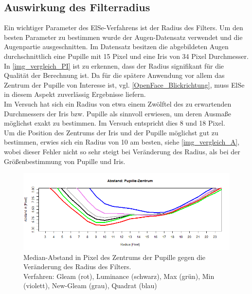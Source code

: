 \subsection{Auswirkung des Filterradius}
Ein wichtiger Parameter des ElSe-Verfahrens ist der Radius des Filters. Um den besten Parameter zu bestimmen wurde der Augen-Datensatz \cite{database_Eye} verwendet und die Augenpartie ausgeschnitten. Im Datensatz besitzen die abgebildeten Augen durchschnittlich eine Pupille mit 15 Pixel und eine Iris von 34 Pixel Durchmesser.\\
In \autoref{img_vergleich_PI} ist zu erkennen, dass der Radius signifikant für die Qualität der Berechnung ist. Da für die spätere Anwendung vor allem das Zentrum der Pupille von Interesse ist, vgl. \autoref{OpenFace_Blickrichtung}, muss ElSe in diesem Aspekt zuverlässig Ergebnisse liefern.\\
Im Versuch hat sich ein Radius von etwa einem Zwölftel des zu erwartenden Durchmessers der Iris bzw. Pupille als sinnvoll erwiesen, um deren Ausmaße möglichst exakt zu bestimmen. Im Versuch entspricht dies 8 und 18 Pixel.\\
Um die Position des Zentrums der Iris und der Pupille möglichst gut zu bestimmen, erwies sich ein Radius von 10 am besten, siehe \autoref{img_vergleich_A}, wobei dieser Fehler nicht so sehr steigt bei Veränderung des Radius, als bei der Größenbestimmung von Pupille und Iris.
\begin{figure}
	\centering
	\includegraphics[width=\linewidth]{Eye_Img_Box/Vergleich_A}
	\caption{Median-Abstand in Pixel des Zentrums der Pupille gegen die Veränderung des Radius des Filters.\\
		Verfahren: Gleam (rot), Luminance (schwarz), Max (grün), Min (violett), New-Gleam (grau), Quadrat (blau)}
	\label{img_vergleich_A}
\end{figure}
